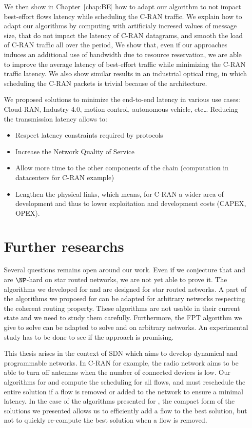 We then show in Chapter~\ref{chap:BE} how to adapt our algorithm to not impact best-effort flows latency while scheduling the C-RAN traffic. We explain how to adapt our algorithms by computing with artificialy incresed values of message size, that do not impact the latency of C-RAN datagrams, and smooth the load of C-RAN traffic all over the period, 
 We show that, even if our approaches induces an additional use of bandwidth due to resource reservation, we are able to improve the average latency of best-effort traffic while minimizing the C-RAN traffic latency. We also show similar results in an industrial optical ring, in which scheduling the C-RAN packets is trivial because of the architecture.

We proposed solutions to minimize the end-to-end latency in various use cases: Cloud-RAN, Industry 4.0, motion control, autonomous vehicle, etc\ldots
Reducing the transmission latency allows to:
\begin{itemize}
	\item Respect latency constraints required by protocols
	\item Increase the Network Quality of Service 
	\item Allow more time to the other components of the chain (computation in datacenters for C-RAN example) 
	\item Lengthen the physical links, which means, for C-RAN a wider area of development and thus to lower exploitation and development costs (CAPEX, OPEX).
\end{itemize} 

\section*{Further researchs}

Several questions remains open around our work. Even if we conjecture that \pazl and \pall are $\NP$-hard on star routed networks, we are not yet able to prove it. 
The algorithms we developed for \pazl and \pall are designed for star routed networks. A part of the algorithms we proposed for \pazl can be adapted for arbitrary networks respecting the coherent routing property. These algorithms are not usable in their current state and we need to study them carefully. Furthermore, the FPT algorithm we give to solve \minstra can be adapted to solve \pazl and \pall on arbitrary networks. An experimental study has to be done to see if the approach is promising.

This thesis arises in the context of SDN which aims to develop dynamical and programmable networks. In C-RAN for example, the radio network aims to be able to turn off antennas when the number of connected devices is low. Our algorithms for \pazl and \pall compute the scheduling for all flows, and must reschedule the entire solution if a flow is removed or added to the network to ensure a minimal latency. In the case of the algorithms presented for \minstra, the compact form of the solutions we presented allows us to efficiently add a flow to the best solution, but not to quickly re-compute the best solution when a flow is removed.

